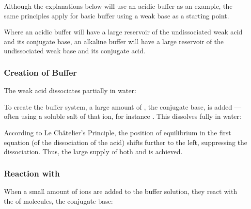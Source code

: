 			Although the explanations below will use an acidic buffer as an example, the same principles apply for basic buffer using a weak
			base as a starting point.

			Where an acidic buffer will have a large reservoir of the undissociated weak acid and its conjugate base, an alkaline buffer will
			have a large reservoir of the undissociated weak base and its conjugate acid.

			\pagebreak
			\subsubsection{Creation of Buffer}

				The weak acid  dissociates partially in water:


				To create the buffer system, a large amount of , the conjugate base, is added --- often using a soluble salt of
				that ion, for instance . This dissolves fully in water:


				According to Le Châtelier's Principle, the position of equilibrium in the first equation (of the dissociation of the acid)
				shifts further to the left, suppressing the dissociation. Thus, the large supply of both  and  is
				achieved.



			\subsubsection{Reaction with \texorpdfstring{}{H⁺}}

				When a small amount of  ions are added to the buffer solution, they react with the  of
				 molecules, the conjugate base:


